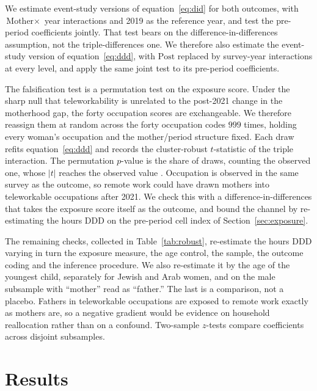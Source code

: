 \documentclass[12pt,a4paper]{article}
\newcommand{\Mother}{\text{Mother}}
\newcommand{\Post}{\text{Post}}
\begin{document}
We estimate event-study versions of equation~\eqref{eq:did} for both outcomes, with
$\Mother \times {}$ year interactions and 2019 as the reference year, and test the pre-period
coefficients jointly. That test bears on the difference-in-differences assumption, not the
triple-differences one. We therefore also estimate the event-study version of
equation~\eqref{eq:ddd}, with $\Post$ replaced by survey-year interactions at every level, and
apply the same joint test to its pre-period coefficients.

\noindent The falsification test is a permutation test on the exposure score. Under the sharp null that
teleworkability is unrelated to the post-2021 change in the motherhood gap, the forty occupation
scores are exchangeable. We therefore reassign them at random across the forty occupation codes
$999$ times, holding every woman's occupation and the mother/period structure fixed. Each draw
refits equation~\eqref{eq:ddd} and records the cluster-robust $t$-statistic of the triple
interaction.
The permutation $p$-value is the share of draws, counting the observed one, whose $|t|$ reaches
the observed value \citep{phipson2010}. Occupation is observed in the same survey as the outcome,
so remote work could have drawn mothers into teleworkable occupations after 2021. We check this
with a difference-in-differences that takes the exposure score itself as the outcome, and bound
the channel by re-estimating the hours DDD on the pre-period cell index of
Section~\ref{sec:exposure}.

\noindent The remaining checks, collected in Table~\ref{tab:robust}, re-estimate the hours DDD varying
in turn the exposure measure, the age control, the sample, the outcome coding and the inference
procedure. We also re-estimate it by the age of the youngest child, separately for Jewish and
Arab women, and on the male subsample with ``mother'' read as ``father.'' The last is a
comparison, not a placebo. Fathers in teleworkable occupations are exposed to remote work exactly
as mothers are, so a negative gradient would be evidence on household reallocation rather than on
a confound. Two-sample $z$-tests compare coefficients across disjoint subsamples.

\section{Results}\label{sec:results}
\end{document}
